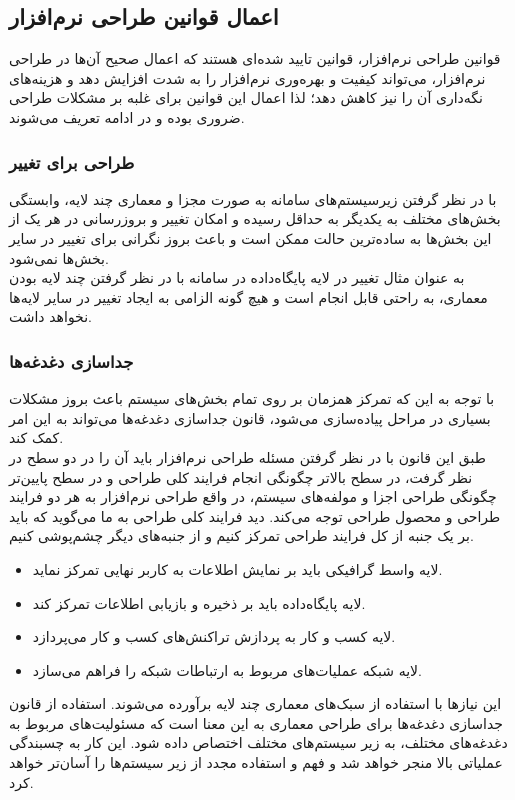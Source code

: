 \documentclass[12pt]{article}
\begin{document}
	\subsection{اعمال قوانین طراحی نرم‌افزار}
	قوانین طراحی نرم‌افزار، قوانین تایید شده‌ای هستند که اعمال صحیح آن‌ها در طراحی نرم‌افزار، می‌تواند کیفیت و بهره‌وری نرم‌افزار را به شدت افزایش دهد و هزینه‌های نگه‌داری آن را نیز کاهش دهد؛ لذا اعمال این قوانین برای غلبه بر مشکلات طراحی ضروری بوده و در ادامه تعریف می‌شوند.
	\subsubsection{طراحی برای تغییر}
	با در نظر گرفتن زیرسیستم‌های سامانه به صورت مجزا و معماری چند لایه، وابستگی بخش‌های مختلف به یکدیگر به حداقل رسیده و امکان تغییر و بروزرسانی در هر یک از این بخش‌ها به ساده‌ترین حالت ممكن است و باعث بروز نگرانی برای تغییر در سایر بخش‌ها نمی‌شود.\\
	به عنوان مثال تغییر در لایه پایگاه‌داده در سامانه با در نظر گرفتن چند لایه بودن معماری، به راحتی قابل انجام است و هیچ گونه الزامی به ایجاد تغییر در سایر لایه‌ها نخواهد داشت.
	\subsubsection{جداسازی دغدغه‌ها}
	با توجه به این که تمرکز همزمان بر روی تمام بخش‌های سیستم باعث بروز مشکلات بسیاری در مراحل پیاده‌سازی می‌شود، قانون جداسازی ‌دغدغه‌ها می‌تواند به این امر کمک کند.\\
	طبق این قانون با در نظر گرفتن مسئله طراحی نرم‌افزار باید آن را در دو سطح در نظر گرفت، در سطح بالاتر چگونگی انجام فرایند کلی طراحی و در سطح پایین‌تر چگونگی طراحی اجزا و مولفه‌های سیستم، در واقع طراحی نرم‌افزار به هر دو فرایند طراحی و محصول طراحی توجه می‌کند. دید فرایند کلی طراحی به ما می‌گوید که باید بر یک جنبه از کل فرایند طراحی تمرکز کنیم و از جنبه‌های دیگر چشم‌پوشی کنیم.

	\begin{itemize}
		\item
		لایه واسط گرافیکی باید بر نمایش اطلاعات به کاربر نهایی تمرکز نماید.
		\item
		لایه پایگاه‌داده باید بر ذخیره و بازیابی اطلاعات تمرکز کند.
		\item
		لایه کسب و کار به پردازش تراکنش‌های کسب و کار می‌پردازد.
		\item
		لایه شبکه عملیات‌های مربوط به ارتباطات شبکه را فراهم می‌سازد.
	\end{itemize}
	این نیازها با استفاده از سبک‌های معماری چند لایه برآورده می‌شوند. استفاده از قانون جداسازی دغدغه‌ها برای طراحی معماری به این معنا است که مسئولیت‌های مربوط به دغدغه‌های مختلف، به زیر سیستم‌های مختلف اختصاص داده شود. این کار به چسبندگی عملیاتی بالا منجر خواهد شد و فهم و استفاده مجدد از زیر سیستم‌ها را آسان‌تر خواهد کرد.
\end{document}
